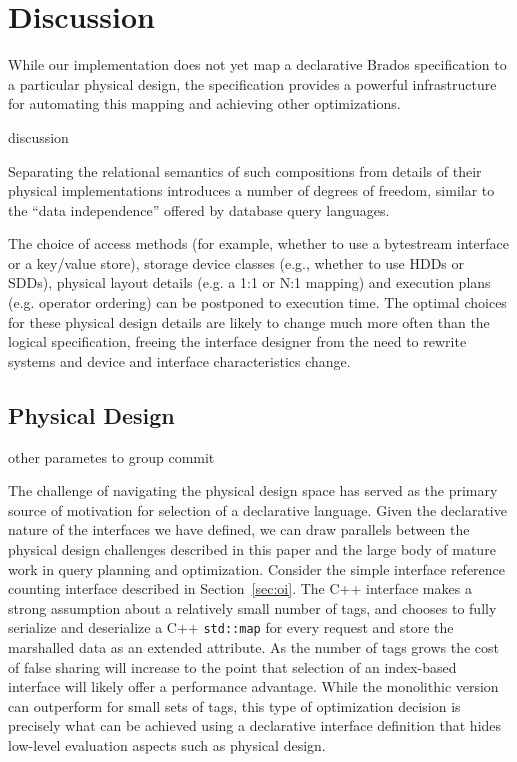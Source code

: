 \section{Discussion}
\label{sec:opts}

While our implementation does not yet map a declarative Brados specification
to a particular physical design, the specification provides a powerful
infrastructure for automating this mapping and achieving other optimizations.

discussion

Separating the relational semantics of such compositions from details
of their physical implementations introduces a number of degrees of freedom,
similar to the ``data independence'' offered by database query languages.

The
choice of access methods (for example, whether to use a bytestream interface
or a key/value store), storage device classes (e.g., whether to use HDDs or
SDDs), physical layout details (e.g. a 1:1 or N:1 mapping) and execution plans
(e.g. operator ordering) can be postponed to execution time.  The optimal
choices for these physical design details are likely to change much more often
than the logical specification, freeing the interface designer from the need
to rewrite systems and device and interface characteristics change.


\subsection{Physical Design}

other parametes to group commit

The challenge of navigating the physical design space
has served as the primary source of motivation for selection of a declarative
language. Given the declarative nature of the interfaces we have defined,
we can draw parallels between the physical design challenges described in this
paper and the
large body of mature work in query planning and optimization. Consider the
simple interface reference counting interface described in
Section~\ref{sec:oi}.  The C++ interface makes a strong assumption about a
relatively small number of tags, and chooses to fully serialize and
deserialize a C++ \texttt{std::map} for every request and store the marshalled
data as an extended attribute.  As the number of tags grows the cost of false
sharing will increase to the point that selection of an index-based interface
will likely offer a performance advantage. While the monolithic version can
outperform for small sets of tags, this type of optimization decision is
precisely what can be achieved using a declarative interface definition that
hides low-level evaluation aspects such as physical design.

